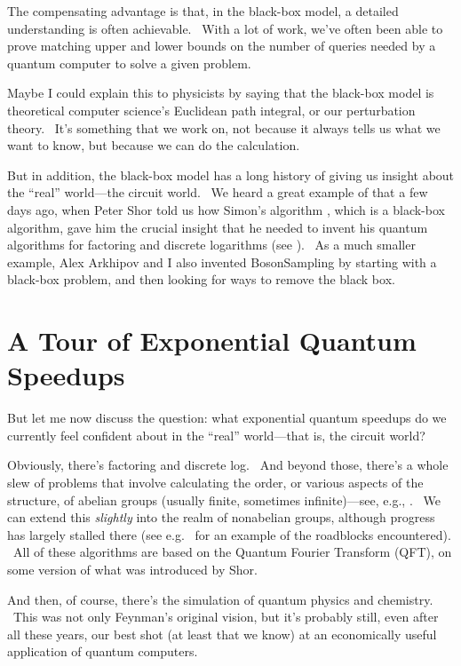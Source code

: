 \documentclass[12pt]{article}
\begin{document}
The compensating advantage is that, in the black-box model, a detailed understanding is often achievable. \ With a lot of work, we've often been able to prove matching upper and lower bounds on the number of queries needed by a quantum computer to solve a given problem.

Maybe I could explain this to physicists by saying that the black-box model is theoretical computer science's Euclidean path integral, or our perturbation theory. \ It's something that we work on, not because it always tells us what we want to know, but because we can do the calculation.

But in addition, the black-box model has a long history of giving us insight about the ``real'' world---the circuit world. \ We heard a great example of that a few days ago, when Peter Shor told us how Simon's algorithm \cite{simon}, which is a black-box algorithm, gave him the crucial insight that he needed to invent his quantum algorithms for factoring and discrete logarithms (see \cite{shor:solvay}). \ As a much smaller example, Alex Arkhipov and I also invented BosonSampling \cite{aark} by starting with a black-box problem, and then looking for ways to remove the black box.


\section{A Tour of Exponential Quantum Speedups}

But let me now discuss the question: what exponential quantum speedups do we currently feel confident about in the ``real'' world---that is, the circuit world?

Obviously, there's factoring and discrete log. \ And beyond those, there's a whole slew of problems that involve calculating the order, or various aspects of the structure, of abelian groups (usually finite, sometimes infinite)---see, e.g., \cite{hallgren}. \ We can extend this \emph{slightly} into the realm of nonabelian groups, although progress has largely stalled there (see e.g.\ \cite{hmrrs} for an example of the roadblocks encountered). \ All of these algorithms are based on the Quantum Fourier Transform (QFT), on some version of what was introduced by Shor.

And then, of course, there's the simulation of quantum physics and chemistry. \ This was not only Feynman's original vision, but it's probably still, even after all these years, our best shot (at least that we know) at an economically useful application of quantum computers.
\end{document}
